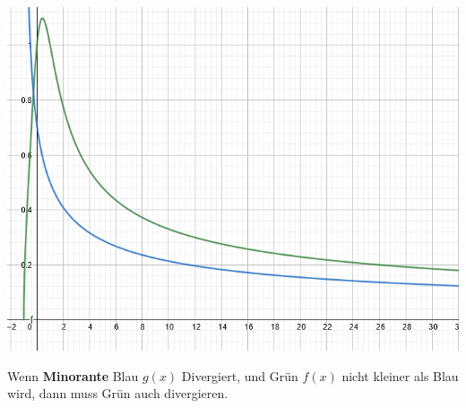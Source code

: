 \begin{center}
	\begin{minipage}{0.2\textwidth}
		\includegraphics[width=\linewidth]{Images/minorante}
	\end{minipage}%
	\begin{minipage}{0.25\textwidth}
		\noindent Wenn \textbf{Minorante} Blau $g(x)$ Divergiert, und Grün $f(x)$ nicht kleiner als Blau wird, dann muss Grün auch divergieren.
	\end{minipage}
\end{center}

